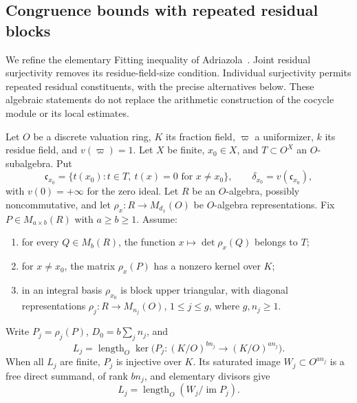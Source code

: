 \subsection{Congruence bounds with repeated residual blocks}
\label{sec:residual-block-fitting}

We refine the elementary Fitting inequality of
Adriazola~\cite[\S17, Proposition \texttt{w4:prop:fitting}]{adriazola-reconstruction}.
Joint residual surjectivity removes its residue-field-size condition.
Individual surjectivity permits repeated residual constituents, with
the precise alternatives below. These algebraic statements do not
replace the arithmetic construction of the cocycle module or its
local estimates.

Let $O$ be a discrete valuation ring, $K$ its fraction field,
$\varpi$ a uniformizer, $k$ its residue field, and $v(\varpi)=1$.
Let $X$ be finite, $x_0\in X$, and $T\subset O^X$ an $O$-subalgebra.
Put
\[
 \mathfrak c_{x_0}=\{t(x_0):t\in T,\ t(x)=0\text{ for }x\ne x_0\},
 \qquad \delta_{x_0}=v(\mathfrak c_{x_0}),
\]
with $v(0)=+\infty$ for the zero ideal. Let $R$ be an $O$-algebra,
possibly noncommutative, and let
$\rho_x:R\to M_{d_x}(O)$ be $O$-algebra representations.
Fix $P\in M_{a\times b}(R)$ with $a\ge b\ge1$. Assume:
\begin{enumerate}
\item for every $Q\in M_b(R)$, the function
      $x\mapsto\det\rho_x(Q)$ belongs to $T$;
\item for $x\ne x_0$, the matrix $\rho_x(P)$ has a nonzero
      kernel over $K$;
\item in an integral basis $\rho_{x_0}$ is block upper triangular,
      with diagonal representations $\rho_j:R\to M_{n_j}(O)$,
      $1\le j\le g$, where $g,n_j\ge1$.
\end{enumerate}
Write $P_j=\rho_j(P)$, $D_0=b\sum_jn_j$, and
\[
 L_j=\operatorname{length}_O
 \ker\bigl(P_j:(K/O)^{bn_j}\to(K/O)^{an_j}\bigr).
\]
When all $L_j$ are finite, $P_j$ is injective over $K$.
Its saturated image $W_j\subset O^{an_j}$ is a free direct summand,
of rank $bn_j$, and elementary divisors give
\begin{equation}\label{eq:residual-block-length}
 L_j=\operatorname{length}_O(W_j/\operatorname{im}P_j).
\end{equation}


